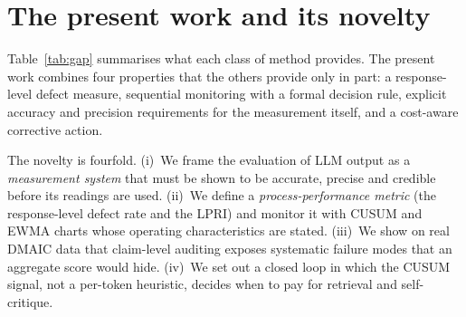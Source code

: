 \documentclass[11pt]{article}
\begin{document}
\section{The present work and its novelty}\label{sec:novelty}

Table~\ref{tab:gap} summarises what each class of method provides. The present work combines four properties that the others provide only in part: a response-level defect measure, sequential monitoring with a formal decision rule, explicit accuracy and precision requirements for the measurement itself, and a cost-aware corrective action.

\begin{table}[!htbp]
\centering\small
\caption{Properties of present evaluation approaches and of this work. \checkmark\ = provided; $\circ$ = partly; -- = not provided.}\label{tab:gap}
\end{table}

The novelty is fourfold. (i)~We frame the evaluation of LLM output as a \emph{measurement system} that must be shown to be accurate, precise and credible before its readings are used. (ii)~We define a \emph{process-performance metric} (the response-level defect rate and the LPRI) and monitor it with CUSUM and EWMA charts whose operating characteristics are stated. (iii)~We show on real DMAIC data that claim-level auditing exposes systematic failure modes that an aggregate score would hide. (iv)~We set out a closed loop in which the CUSUM signal, not a per-token heuristic, decides when to pay for retrieval and self-critique.
\end{document}
